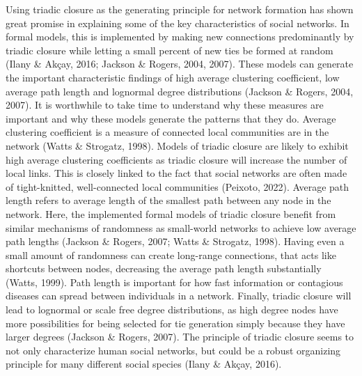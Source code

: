 \documentclass{article}
\begin{document}
Using triadic closure as the generating principle for network formation has shown great promise in explaining some of the key characteristics of social networks. In formal models, this is implemented by making new connections predominantly by triadic closure while letting a small percent of new ties be formed at random (Ilany \& Akçay, 2016; Jackson \& Rogers, 2004, 2007). These models can generate the important characteristic findings of high average clustering coefficient, low average path length and lognormal degree distributions (Jackson \& Rogers, 2004, 2007). 
It is worthwhile to take time to understand why these measures are important and why these models generate the patterns that they do. Average clustering coefficient is a measure of connected local communities are in the network (Watts \& Strogatz, 1998). Models of triadic closure are likely to exhibit high average clustering coefficients as triadic closure will increase the number of local links. This is closely linked to the fact that social networks are often made of tight-knitted, well-connected local communities (Peixoto, 2022). Average path length refers to average length of the smallest path between any node in the network. Here, the implemented formal models of triadic closure benefit from similar mechanisms of randomness as small-world networks to achieve low average path lengths (Jackson \& Rogers, 2007; Watts \& Strogatz, 1998). Having even a small amount of randomness can create long-range connections, that acts like shortcuts between nodes, decreasing the average path length substantially (Watts, 1999). Path length is important for how fast information or contagious diseases can spread between individuals in a network. Finally, triadic closure will lead to lognormal or scale free degree distributions, as high degree nodes have more possibilities for being selected for tie generation simply because they have larger degrees (Jackson \& Rogers, 2007). The principle of triadic closure seems to not only characterize human social networks, but could be a robust organizing principle for many different social species (Ilany \& Akçay, 2016). 
\end{document}
